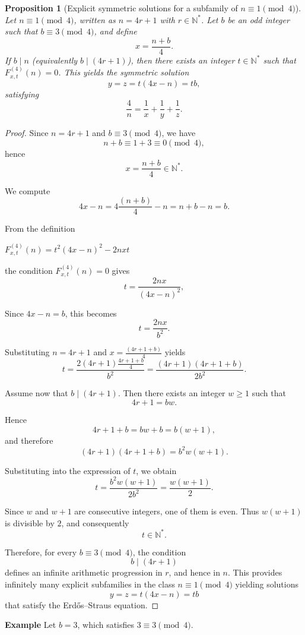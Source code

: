 \documentclass[12pt]{article}
\newtheorem{proposition}{Proposition}
\begin{document}
  \begin{proposition}[Explicit symmetric solutions for a subfamily of \(n \equiv 1 \pmod{4}\)]
Let \(n \equiv 1 \pmod{4}\), written as \(n = 4r + 1\) with \(r \in \mathbb{N}^*\). 
Let \(b\) be an odd integer such that \(b \equiv 3 \pmod{4}\), and define
\[
x = \frac{n+b}{4}.
\]
If \(b \mid n\) (equivalently \(b \mid (4r+1)\)), then there exists an integer \(t \in \mathbb{N}^*\) such that
\(F_{x,t}^{(4)}(n) = 0\). This yields the symmetric solution
\[
y = z = t(4x-n) = t b,
\]
satisfying
\[
\frac{4}{n} = \frac{1}{x} + \frac{1}{y} + \frac{1}{z}.
\]
\end{proposition}
\begin{proof}
Since $n = 4r+1$ and $b \equiv 3 \pmod{4}$, we have
\[
n+b \equiv 1+3 \equiv 0 \pmod{4},
\]
hence
\[
x = \frac{n+b}{4} \in \mathbb{N}^*.
\]

We compute
\[
4x-n = 4\frac{(n+b)}{4} - n = n+b-n = b .
\]

From the definition

\(F_{x,t}^{(4)}(n)=t^2(4x-n)^2 - 2nxt\)

the condition \(F_{x,t}^{(4)}(n)=0\) gives
\[
t = \frac{2nx}{(4x-n)^2}, 
\]

Since $4x-n = b$, this becomes
\[
t = \frac{2nx}{b^2}.
\]

Substituting $n=4r+1$ and $x=\frac{(4r+1+b)}{4}$ yields
\[
t
= \frac{2(4r+1)\frac{4r+1+b}{4}}{b^2}
= \frac{(4r+1)(4r+1+b)}{2b^2}.
\]

Assume now that $b \mid (4r+1)$. Then there exists an integer $w \ge 1$ such that
\[
4r+1 = bw.
\]

Hence
\[
4r+1+b = bw + b = b(w+1),
\]
and therefore
\[
(4r+1)(4r+1+b) = b^2 w(w+1).
\]

Substituting into the expression of $t$, we obtain
\[
t = \frac{b^2 w(w+1)}{2b^2}
  = \frac{w(w+1)}{2}.
\]

Since $w$ and $w+1$ are consecutive integers, one of them is even.
Thus $w(w+1)$ is divisible by $2$, and consequently
\[
t \in \mathbb{N}^*.
\]

Therefore, for every $b \equiv 3 \pmod{4}$, the condition
\[
b \mid (4r+1)
\]
defines an infinite arithmetic progression in $r$, and hence in $n$.
This provides infinitely many explicit subfamilies in the class
$n \equiv 1 \pmod{4}$ yielding solutions
\[
y = z = t(4x-n)=tb
\]
that satisfy the Erd\H{o}s--Straus equation.
\end{proof}

\noindent\textbf{Example}  
Let $b=3$, which satisfies $3 \equiv 3 \pmod{4}$.
\end{document}
